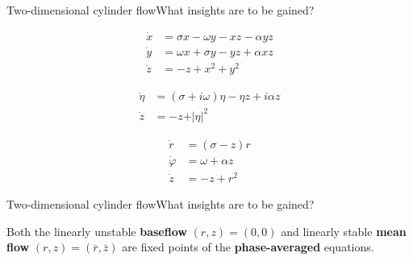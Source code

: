 \documentclass[usenames,dvipsnames,svgnames,10pt,aspectratio=169]{beamer}
\begin{document}
\begin{frame}[t, c]{Two-dimensional cylinder flow}{What insights are to be gained?}
  \begin{overprint}
    \[
    \begin{aligned}
      \dot{x} & = \sigma x - \omega y - xz - \alpha yz\\
      \dot{y} & = \omega x + \sigma y - yz + \alpha xz \\
      \dot{z} & = -z + x^2 + y^2
    \end{aligned}
    \]
    
    \[
    \begin{aligned}
      \dot{\eta} & = \left( \sigma + i \omega \right) \eta - \eta z + i \alpha z \\
      \dot{z} & = - z + \vert \eta \vert^2
    \end{aligned}
    \]
    
    \[
    \begin{aligned}
      \dot{r} & = \left( \sigma - z \right) r\\
      \dot{\varphi} & = \omega + \alpha z\\
      \dot{z} & = -z + r^2
    \end{aligned}
    \]
    
  \end{overprint}
\end{frame}

\begin{frame}[t, c]{Two-dimensional cylinder flow}{What insights are to be gained?}
  \begin{minipage}{.58\textwidth}
    Both the linearly unstable \alert{\textbf{baseflow}} \( (r, z) = (0, 0) \) and linearly stable \alert{\textbf{mean flow}} \( (r, z) = (\bar{r}, \bar{z}) \) are fixed points of the \alert{\textbf{phase-averaged}} equations.
  \end{minipage}%
  \hfill
  \begin{minipage}{.38\textwidth}
    \centering
  \end{minipage}
\end{frame}
\end{document}
